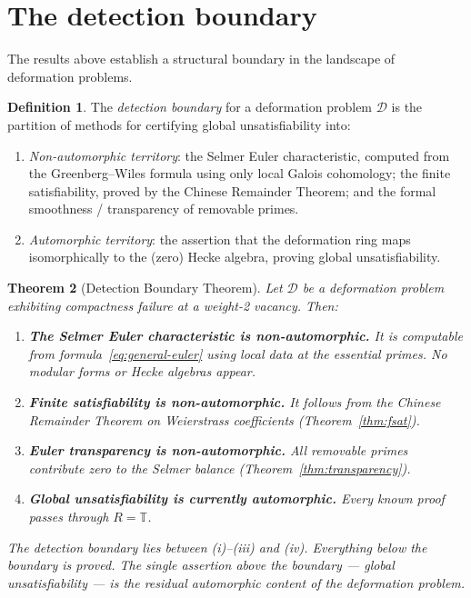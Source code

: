 \documentclass[12pt]{amsart}
\newtheorem{theorem}{Theorem}[section]
\theoremstyle{definition}
\newtheorem{definition}[theorem]{Definition}
\theoremstyle{remark}
\begin{document}
\section{The detection boundary}
\label{sec:detection}

The results above establish a structural boundary in the landscape of deformation problems.

\begin{definition}\label{def:detection-boundary}
The \emph{detection boundary} for a deformation problem $\mathcal{D}$ is the partition of methods for certifying global unsatisfiability into:
\begin{enumerate}[label=(\alph*)]
\item \emph{Non-automorphic territory}: the Selmer Euler characteristic, computed from the Greenberg--Wiles formula using only local Galois cohomology; the finite satisfiability, proved by the Chinese Remainder Theorem; and the formal smoothness / transparency of removable primes.
\item \emph{Automorphic territory}: the assertion that the deformation ring maps isomorphically to the (zero) Hecke algebra, proving global unsatisfiability.
\end{enumerate}
\end{definition}

\begin{theorem}[Detection Boundary Theorem]\label{thm:detection}
Let $\mathcal{D}$ be a deformation problem exhibiting compactness failure at a weight-2 vacancy. Then:
\begin{enumerate}[label=(\roman*)]
\item \textbf{The Selmer Euler characteristic is non-automorphic.} It is computable from formula~\eqref{eq:general-euler} using local data at the essential primes. No modular forms or Hecke algebras appear.
\item \textbf{Finite satisfiability is non-automorphic.} It follows from the Chinese Remainder Theorem on Weierstrass coefficients (Theorem~\ref{thm:fsat}).
\item \textbf{Euler transparency is non-automorphic.} All removable primes contribute zero to the Selmer balance (Theorem~\ref{thm:transparency}).
\item \textbf{Global unsatisfiability is currently automorphic.} Every known proof passes through $R = \mathbb{T}$.
\end{enumerate}
The detection boundary lies between (i)--(iii) and (iv). Everything below the boundary is proved. The single assertion above the boundary --- global unsatisfiability --- is the residual automorphic content of the deformation problem.
\end{theorem}
\end{document}
